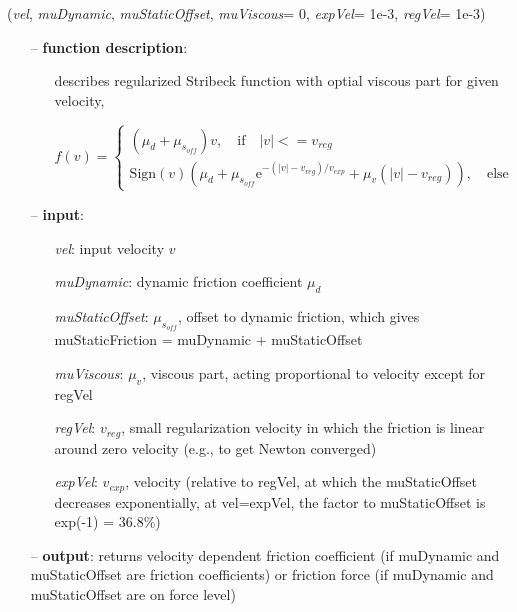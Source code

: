 \begin{itemize}[leftmargin=1.4cm]
\begin{itemize}[leftmargin=0.5cm]
\begin{itemize}[leftmargin=1.4cm]
\begin{itemize}[leftmargin=0.5cm]
\begin{itemize}[leftmargin=1.4cm]
\begin{itemize}[leftmargin=0.5cm]
\begin{itemize}[leftmargin=1.4cm]
\begin{itemize}[leftmargin=1.4cm]
\begin{itemize}[leftmargin=1.4cm]
\begin{itemize}[leftmargin=1.4cm]
\begin{itemize}[leftmargin=0.5cm]
\begin{itemize}[leftmargin=1.4cm]
\begin{flushleft}
({\it vel}, {\it muDynamic}, {\it muStaticOffset}, {\it muViscous}= 0, {\it expVel}= 1e-3, {\it regVel}= 1e-3)
\end{flushleft}
\setlength{\itemindent}{0.7cm}
\begin{itemize}[leftmargin=0.7cm]
  \item[--]  {\bf function description}: \vspace{-6pt}
  \begin{itemize}[leftmargin=1.2cm]
\setlength{\itemindent}{-0.7cm}
    \item[] describes regularized Stribeck function with optial viscous part for given velocity,
    \item[]   $f(v) = \begin{cases} (\mu_d + \mu_{s_{off}}) v, \quad \mathrm{if} \quad |v| <= v_{reg}\\ \mathrm{Sign}(v)\left( \mu_d + \mu_{s_{off}} \mathrm{e}^{-(|v|-v_{reg})/v_{exp}} + \mu_v (|v|-v_{reg}) \right), \quad \mathrm{else}\end{cases}$
  \end{itemize}
  \item[--]  {\bf input}: \vspace{-6pt}
  \begin{itemize}[leftmargin=1.2cm]
\setlength{\itemindent}{-0.7cm}
    \item[] {\it vel}: input velocity $v$
    \item[] {\it   muDynamic}: dynamic friction coefficient $\mu_d$
    \item[] {\it   muStaticOffset}: $\mu_{s_{off}}$, offset to dynamic friction, which gives muStaticFriction = muDynamic + muStaticOffset
    \item[] {\it   muViscous}: $\mu_v$, viscous part, acting proportional to velocity except for regVel
    \item[] {\it   regVel}: $v_{reg}$,  small regularization velocity in which the friction is linear around zero velocity (e.g., to get Newton converged)
    \item[] {\it   expVel}: $v_{exp}$,  velocity (relative to regVel, at which the muStaticOffset decreases exponentially, at vel=expVel, the factor to muStaticOffset is exp(-1) = 36.8\%)
  \end{itemize}
  \item[--]  {\bf output}: returns velocity dependent friction coefficient (if muDynamic and muStaticOffset are friction coefficients) or friction force (if muDynamic and muStaticOffset are on force level)\vspace{12pt}\end{itemize}

\end{itemize}
\end{itemize}
\end{itemize}
\end{itemize}
\end{itemize}
\end{itemize}
\end{itemize}
\end{itemize}
\end{itemize}
\end{itemize}
\end{itemize}
\end{itemize}
